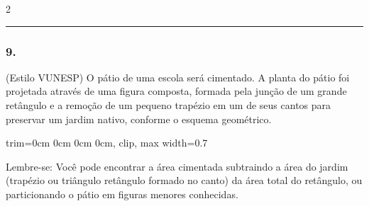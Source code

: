 \documentclass[twoside, 10pt, a4paper]{article}
\newlength{\espacoPreQuestao}\setlength{\espacoPreQuestao}{0.1cm}
\begin{document}
\begin{multicols*}{2}
\noindent\textcolor{CorLinha}{\rule{\linewidth}{0.5pt}} 
\par\vspace{\espacoPreQuestao}
\subsubsection*{9.} (Estilo VUNESP) O pátio de uma escola será cimentado. A planta do pátio foi projetada através de uma figura composta, formada pela junção de um grande retângulo e a remoção de um pequeno trapézio em um de seus cantos para preservar um jardim nativo, conforme o esquema geométrico.

\begin{center}
\begin{adjustbox}{trim=0cm 0cm 0cm 0cm, clip, max width=0.7\linewidth}
\end{adjustbox}
\end{center}

\begin{boxdica}
Lembre-se: Você pode encontrar a área cimentada subtraindo a área do jardim (trapézio ou triângulo retângulo formado no canto) da área total do retângulo, ou particionando o pátio em figuras menores conhecidas.
\end{boxdica}


\end{multicols*}
\end{document}
